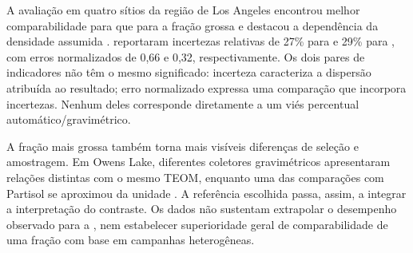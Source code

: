 A avaliação em quatro sítios da região de Los Angeles encontrou melhor comparabilidade para \MPdoiscinco{} que para a fração grossa e destacou a dependência da densidade assumida \parencite{rsl288}. \textcite{rsl283} reportaram incertezas relativas de 27\% para \MPdez{} e 29\% para \MPdoiscinco{}, com erros normalizados de 0,66 e 0,32, respectivamente. Os dois pares de indicadores não têm o mesmo significado: incerteza caracteriza a dispersão atribuída ao resultado; erro normalizado expressa uma comparação que incorpora incertezas. Nenhum deles corresponde diretamente a um viés percentual automático/gravimétrico.

A fração mais grossa também torna mais visíveis diferenças de seleção e amostragem. Em Owens Lake, diferentes coletores gravimétricos apresentaram relações distintas com o mesmo TEOM, enquanto uma das comparações com Partisol se aproximou da unidade \parencite{rsl136}. A referência escolhida passa, assim, a integrar a interpretação do contraste. Os dados não sustentam extrapolar o desempenho observado para \MPdoiscinco{} a \MPdez{}, nem estabelecer superioridade geral de comparabilidade de uma fração com base em campanhas heterogêneas.

